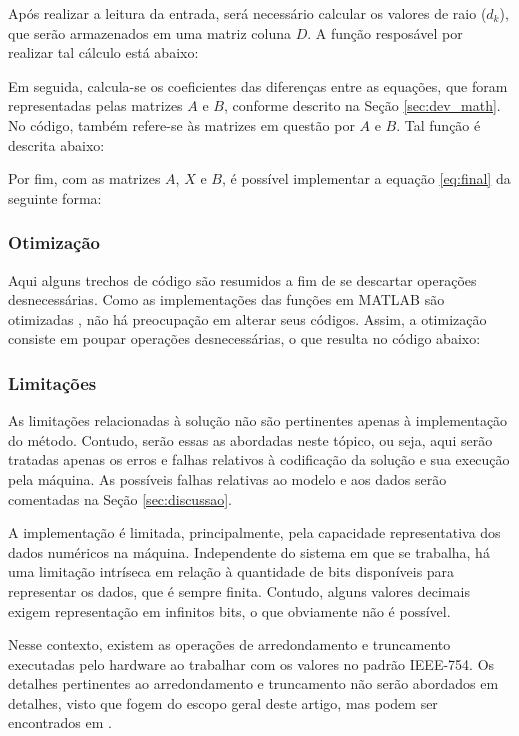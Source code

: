 
	Após realizar a leitura da entrada, será necessário calcular os valores de raio ($d_k$), que serão
	armazenados em uma matriz coluna $D$. A função resposável por realizar tal cálculo está abaixo:


	Em seguida, calcula-se os coeficientes das diferenças entre as equações, que foram representadas
	pelas matrizes $A$ e $B$, conforme descrito na Seção \ref{sec:dev_math}. No código, também refere-se às matrizes
	em questão por $A$ e $B$. Tal função é descrita abaixo:


	Por fim, com as matrizes $A$, $X$ e $B$, é possível implementar a equação \ref{eq:final} da seguinte
	forma:


	\subsubsection{Otimização}
	\label{sec:opt}
	Aqui alguns trechos de código são resumidos a fim de se descartar operações desnecessárias.
	Como as implementações das funções em MATLAB são otimizadas \cite{matlabguide}, não há preocupação
	em alterar seus códigos. Assim, a otimização consiste em poupar operações desnecessárias, o que resulta
	no código abaixo:

	\subsubsection{Limitações}
	\label{sec:lim}
	As limitações relacionadas à solução não são pertinentes apenas à implementação do método. Contudo,
	serão essas as abordadas neste tópico, ou seja, aqui serão tratadas apenas os erros e falhas relativos
	à codificação da solução e sua execução pela máquina. As possíveis falhas relativas ao modelo e aos
	dados serão comentadas na Seção \ref{sec:discussao}.

	A implementação é limitada, principalmente, pela capacidade representativa dos dados numéricos na máquina.
	Independente do sistema em que se trabalha, há uma limitação intríseca em relação à quantidade de bits disponíveis
	para representar os dados, que é sempre finita. Contudo, alguns valores decimais exigem representação em infinitos
	bits, o que obviamente não é possível.

	Nesse contexto, existem as operações de arredondamento e truncamento executadas pelo hardware ao trabalhar com
	os valores no padrão IEEE-754. Os detalhes pertinentes ao arredondamento e truncamento não serão abordados em detalhes,
	visto que fogem do escopo geral deste artigo, mas podem ser encontrados em \cite{polidorio:ieee}.


